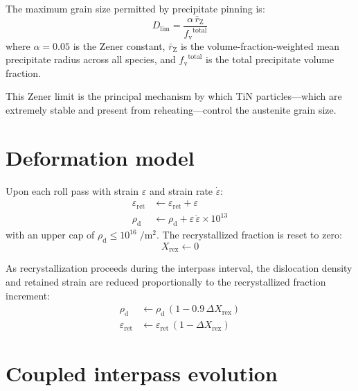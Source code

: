 \documentclass[11pt,a4paper]{article}
\newcommand{\Xrex}{\ensuremath{X_\mathrm{rex}}}
\newcommand{\epsr}{\ensuremath{\varepsilon_\mathrm{ret}}}
\newcommand{\epsrate}{\ensuremath{\dot\varepsilon}}
\newcommand{\rhod}{\ensuremath{\rho_\mathrm{d}}}
\newcommand{\fv}{\ensuremath{f_\mathrm{v}}}
\begin{document}
The maximum grain size permitted by precipitate pinning is:
\begin{equation}
  D_\mathrm{lim} = \frac{\alpha\,\bar{r}_\mathrm{Z}}{\fv^\mathrm{total}}
  \label{eq:zener}
\end{equation}
where $\alpha = 0.05$ is the Zener constant, $\bar{r}_\mathrm{Z}$ is the
volume-fraction-weighted mean precipitate radius across all species, and
$\fv^\mathrm{total}$ is the total precipitate volume fraction.

This Zener limit is the principal mechanism by which TiN particles---which
are extremely stable and present from reheating---control the austenite
grain size.

\section{Deformation model}
\label{sec:deform}

Upon each roll pass with strain $\varepsilon$ and strain rate $\epsrate$:
\begin{align}
  \epsr &\leftarrow \epsr + \varepsilon
    \label{eq:epsacc} \\
  \rhod &\leftarrow \rhod + \varepsilon\,\epsrate \times 10^{13}
    \label{eq:rhoincr}
\end{align}
with an upper cap of $\rhod \le 10^{16}\;\si{\per\metre\squared}$.  The
recrystallized fraction is reset to zero:
\begin{equation}
  \Xrex \leftarrow 0
\end{equation}

As recrystallization proceeds during the interpass interval, the dislocation
density and retained strain are reduced proportionally to the recrystallized
fraction increment:
\begin{align}
  \rhod &\leftarrow \rhod\,(1 - 0.9\,\Delta\Xrex) \\
  \epsr &\leftarrow \epsr\,(1 - \Delta\Xrex)
\end{align}

\section{Coupled interpass evolution}
\label{sec:interpass}
\end{document}
